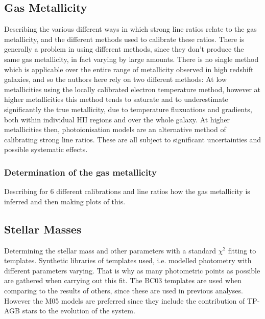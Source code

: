 \documentclass{literature}
\begin{document}
\subsection{Gas Metallicity}
Describing the various different ways in which strong line ratios relate to the gas metallicity, and the different methods used to calibrate these ratios. There is generally a problem in using different methods, since they don't produce the same gas metallicity, in fact varying by large amounts. There is no single method which is applicable over the entire range of metallicity observed in high redshift galaxies, and so the authors here rely on two different methods: At low metallicities using the locally calibrated electron temperature method, however at higher metallicities this method tends to saturate and to underestimate significantly the true metallicity, due to temperature fluxuations and gradients, both within individual HII regions and over the whole galaxy. At higher metallicities then, photoionisation models are an alternative method of calibrating strong line ratios. These are all subject to significant uncertainties and possible systematic effects.
\subsubsection{Determination of the gas metallicity}
Describing for 6 different calibrations and line ratios how the gas metallicity is inferred and then making plots of this.
\subsection{Stellar Masses}
Determining the stellar mass and other parameters with a standard $\chi ^{2}$ fitting to templates. Synthetic libraries of templates used, i.e. modelled photometry with different parameters varying. That is why as many photometric points as possible are gathered when carrying out this fit. The BC03 \citep{Bruzual_2003} templates are used when comparing to the results of others, since these are used in previous analyses. However the M05 \citep{Maraston_2005} models are preferred since they include the contribution of TP-AGB stars to the evolution of the system.
\end{document}
